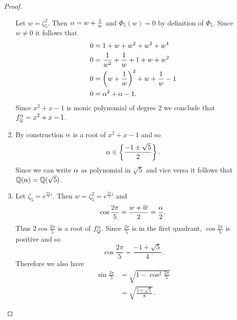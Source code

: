 \begin{proof}
\begin{enumerate}
            Let $w=\zeta_5^2$. Then $\alpha=w+\frac1w$ and $\Phi_5(w)=0$ by definition of $\Phi_5$. Since $w\neq0$ it follows that
            \begin{align*}
                0&=1+w+w^2+w^3+w^4\\
                0&=\frac{1}{w^2}+\frac1w+1+w+w^2\\
                0&=\left(w+\frac1w\right)^2+w+\dfrac1w-1\\
                0&=\alpha^2+\alpha-1.
            \end{align*}
            Since $x^2+x-1$ is monic polynomial of degree 2 we conclude that $f^\alpha_{\mathbb{Q}}=x^2+x-1$.
        \item By construction $\alpha$ is a root of $x^2+x-1$ and so
            $$\alpha\in\left\{\frac{-1\pm\sqrt{5}}{2}\right\}.$$
            Since we can write $\alpha$ as polynomial in $\sqrt{5}$ and vice versa it follows that $\mathbb{Q}(\alpha)=\mathbb{Q}(\sqrt{5})$.
        \item Let $\zeta_5=e^{\frac{6\pi}{5}i}$. Then $w=\zeta_5^2=e^{\frac{2\pi}{5}i}$ and 
            $$\cos\frac{2\pi}{5}=\frac{w+\overline{w}}{2}=\frac{\alpha}{2}.$$
            Thus $2\cos\frac{2\pi}{5}$ is a root of $f^\alpha_Q$. Since $\frac{2\pi}{5}$ is in the first quadrant, $\cos\frac{2\pi}{5}$ is positive and so
            $$\cos\frac{2\pi}{5}=\frac{-1+\sqrt{5}}{4}.$$
            Therefore we also have
            \begin{align*}
                \sin\frac{2\pi}{5}&=\sqrt{1-\cos^2\frac{2\pi}{5}}\\
                &=\sqrt{\frac{5+\sqrt{5}}{8}}.
            \end{align*}
        \end{enumerate}
    \end{proof}


